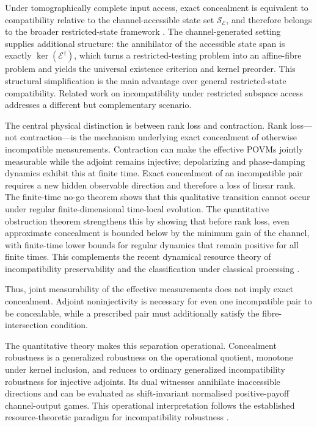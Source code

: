 \documentclass[
aps,pra,twocolumn,10pt,
superscriptaddress,longbibliography,floatfix
]{revtex4-2}
\begin{document}
Under tomographically complete input access, exact concealment is equivalent to compatibility relative to the channel-accessible state set $\mathcal S_{\mathcal E}$, and therefore belongs to the broader restricted-state framework \cite{Heinosaari2021FewStates}. The channel-generated setting supplies additional structure: the annihilator of the accessible state span is exactly $\ker(\mathcal E^\dagger)$, which turns a restricted-testing problem into an affine-fibre problem and yields the universal existence criterion and kernel preorder. This structural simplification is the main advantage over general restricted-state compatibility. Related work on incompatibility under restricted subspace access \cite{Uola2021Subspaces} addresses a different but complementary scenario.

The central physical distinction is between rank loss and contraction. Rank loss---not contraction---is the mechanism underlying exact concealment of otherwise incompatible measurements. Contraction can make the effective POVMs jointly measurable while the adjoint remains injective; depolarizing and phase-damping dynamics exhibit this at finite time. Exact concealment of an incompatible pair requires a new hidden observable direction and therefore a loss of linear rank. The finite-time no-go theorem shows that this qualitative transition cannot occur under regular finite-dimensional time-local evolution. The quantitative obstruction theorem strengthens this by showing that before rank loss, even approximate concealment is bounded below by the minimum gain of the channel, with finite-time lower bounds for regular dynamics that remain positive for all finite times. This complements the recent dynamical resource theory of incompatibility preservability \cite{Hsieh2025} and the classification under classical processing \cite{Das2026}.

Thus, joint measurability of the effective measurements does not imply exact concealment. Adjoint noninjectivity is necessary for even one incompatible pair to be concealable, while a prescribed pair must additionally satisfy the fibre-intersection condition.

The quantitative theory makes this separation operational. Concealment robustness is a generalized robustness on the operational quotient, monotone under kernel inclusion, and reduces to ordinary generalized incompatibility robustness for injective adjoints. Its dual witnesses annihilate inaccessible directions and can be evaluated as shift-invariant normalised positive-payoff channel-output games. This operational interpretation follows the established resource-theoretic paradigm for incompatibility robustness \cite{Regula2018,Takagi2019,Skrzypczyk2019}.
\end{document}
